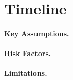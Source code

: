 \section{Timeline}
\label{sec:research_method}

\paragraph{Key Assumptions.}

\paragraph{Risk Factors.}

\paragraph{Limitations.}
